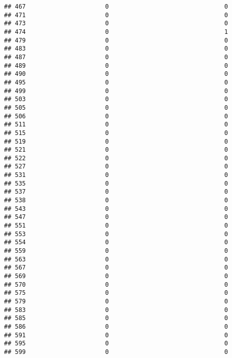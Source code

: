 \documentclass[
]{article}
\begin{document}
\begin{verbatim}
## 467                      0                                0
## 471                      0                                0
## 473                      0                                0
## 474                      0                                1
## 479                      0                                0
## 483                      0                                0
## 487                      0                                0
## 489                      0                                0
## 490                      0                                0
## 495                      0                                0
## 499                      0                                0
## 503                      0                                0
## 505                      0                                0
## 506                      0                                0
## 511                      0                                0
## 515                      0                                0
## 519                      0                                0
## 521                      0                                0
## 522                      0                                0
## 527                      0                                0
## 531                      0                                0
## 535                      0                                0
## 537                      0                                0
## 538                      0                                0
## 543                      0                                0
## 547                      0                                0
## 551                      0                                0
## 553                      0                                0
## 554                      0                                0
## 559                      0                                0
## 563                      0                                0
## 567                      0                                0
## 569                      0                                0
## 570                      0                                0
## 575                      0                                0
## 579                      0                                0
## 583                      0                                0
## 585                      0                                0
## 586                      0                                0
## 591                      0                                0
## 595                      0                                0
## 599                      0                                0

\end{verbatim}
\end{document}

